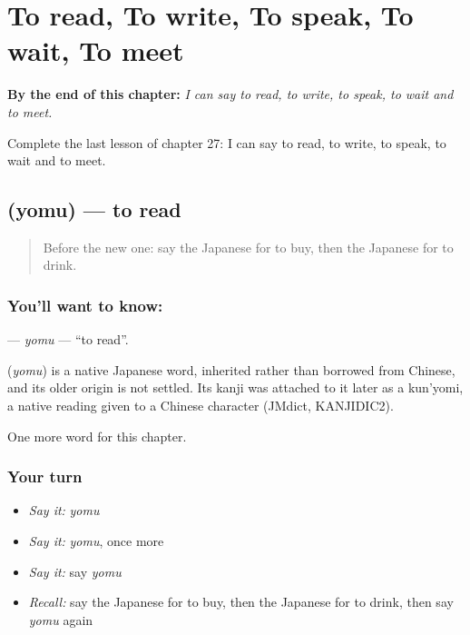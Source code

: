 
\chapter{To read, To write, To speak, To wait, To meet}
\label{ch:ja-to-read-to-write-to-speak-to-wait-to-meet}

\begin{chapteropening}
\textbf{By the end of this chapter:} \emph{I can say to read, to write, to speak, to wait and to meet.}

Complete the last lesson of chapter 27: I can say to read, to write, to speak, to wait and to meet.
\end{chapteropening}

\section[\texorpdfstring{\ja{よむ} (yomu)}{よむ (yomu)}]{ (yomu) — to read}

\label{lesson:JA-C27-yomu}



\begin{quote}
Before the new one: say the Japanese for to buy, then the Japanese for to drink.
\end{quote}

\subsection*{You'll want to know: }
\textbf{} — \emph{yomu} — \textquotedblleft{}to read\textquotedblright{}.

\begin{cousinweb}
\textbf{} (\emph{yomu}) is a native Japanese word, inherited rather than borrowed from Chinese, and its older origin is not settled. Its kanji was attached to it later as a kun'yomi, a native reading given to a Chinese character (JMdict, KANJIDIC2).
\end{cousinweb}

\begin{grammarlens}[title={What you've built}]
One more word for this chapter.
\end{grammarlens}

\subsection*{Your turn}
\begin{itemize}
\raggedright
  \item \emph{Say it:} \emph{yomu}
  \item \emph{Say it:} \emph{yomu}, once more
  \item \emph{Say it:} say \emph{yomu}
  \item \emph{Recall:} say the Japanese for to buy, then the Japanese for to drink, then say \emph{yomu} again
\end{itemize}

